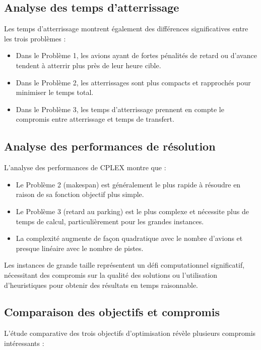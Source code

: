 \documentclass[a4paper,12pt]{report}
\begin{document}
\subsection{Analyse des temps d'atterrissage}
Les temps d'atterrissage montrent également des différences significatives entre les trois problèmes :

\begin{itemize}
  \item Dans le Problème 1, les avions ayant de fortes pénalités de retard ou d'avance tendent à atterrir plus près de leur heure cible.
  \item Dans le Problème 2, les atterrissages sont plus compacts et rapprochés pour minimiser le temps total.
  \item Dans le Problème 3, les temps d'atterrissage prennent en compte le compromis entre atterrissage et temps de transfert.
\end{itemize}

\subsection{Analyse des performances de résolution}
L'analyse des performances de CPLEX montre que :

\begin{itemize}
  \item Le Problème 2 (makespan) est généralement le plus rapide à résoudre en raison de sa fonction objectif plus simple.
  \item Le Problème 3 (retard au parking) est le plus complexe et nécessite plus de temps de calcul, particulièrement pour les grandes instances.
  \item La complexité augmente de façon quadratique avec le nombre d'avions et presque linéaire avec le nombre de pistes.
\end{itemize}

Les instances de grande taille représentent un défi computationnel significatif, nécessitant des compromis sur la qualité des solutions ou l'utilisation d'heuristiques pour obtenir des résultats en temps raisonnable.

\subsection{Comparaison des objectifs et compromis}
L'étude comparative des trois objectifs d'optimisation révèle plusieurs compromis intéressants :
\end{document}
